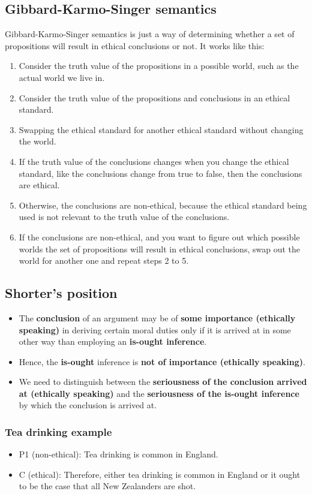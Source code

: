 \documentclass[11pt]{article}
\begin{document}
 \newpage
\subsection{Gibbard-Karmo-Singer semantics}
\label{sec:org58ba506}
Gibbard-Karmo-Singer semantics is just a way of determining whether a set of propositions will result in ethical conclusions or not. It works like this:
\begin{enumerate}
\item Consider the truth value of the propositions in a possible world, such as the actual world we live in.
\item Consider the truth value of the propositions and conclusions in an ethical standard.
\item Swapping the ethical standard for another ethical standard without changing the world.
\item If the truth value of the conclusions changes when you change the ethical standard, like the conclusions change from true to false, then the conclusions are ethical.
\item Otherwise, the conclusions are non-ethical, because the ethical standard being used is not relevant to the truth value of the conclusions.
\item If the conclusions are non-ethical, and you want to figure out which possible worlds the set of propositions will result in ethical conclusions, swap out the world for another one and repeat steps 2 to 5.
\end{enumerate}
\subsection{Shorter's position}
\label{sec:org7cd038f}
\begin{itemize}
\item The \textbf{conclusion} of an argument may be of \textbf{some importance (ethically speaking)} in deriving certain moral duties only if it is arrived at in some other way than employing an \textbf{is-ought inference}.
\item Hence, the \textbf{is-ought} inference is \textbf{not of importance (ethically speaking)}.
\item We need to distinguish between the \textbf{seriousness of the conclusion arrived at (ethically speaking)} and the \textbf{seriousness of the is-ought inference} by which the conclusion is arrived at.
\end{itemize}

 \newpage
\subsubsection{Tea drinking example}
\label{sec:org59be3d0}
\begin{itemize}
\item P1 (non-ethical): Tea drinking is common in England.
\item C (ethical): Therefore, either tea drinking is common in England or it ought to be the case that all New Zealanders are shot.
\end{itemize}
\end{document}
